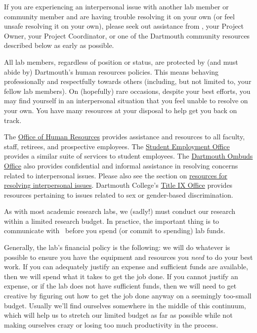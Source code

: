 \documentclass{tufte-book} %
\newcommand{\ourschool}{Dartmouth College}
\begin{document}
\noindent
If you are experiencing an interpersonal issue with another lab member
or community member and are having trouble resolving it on your own
(or feel unsafe resolving it on your own), please seek out assistance
from \director, your Project Owner, your Project Coordinator, or one
of the Dartmouth community resources described below as early as
possible.

All lab members, regardless of position or status, are protected by
(and must abide by) Dartmouth's human resources policies.  This means
behaving professionally and respectfully towards others (including,
but not limited to, your fellow lab members).  On (hopefully) rare
occasions, despite your best efforts, you may find yourself in an
interpersonal situation that you feel unable to resolve on your own.
You have many resources at your disposal to help get you back on
track.

The \href{http://www.dartmouth.edu/~hrs/}{Office of Human Resources} provides
assistance and resources to all faculty, staff, retirees, and prospective
employees. The \href{http://www.dartmouth.edu/~seo/}{Student Employment Office}
provides a similar suite of services to student employees. The
\href{http://www.dartmouth.edu/~ombuds/}{Dartmouth Ombuds Office} also provides
confidential and informal assistance in resolving concerns related to
interpersonal issues. Please also see the section on
\hyperref[sec:interpersonal]{resources for resolving interpersonal issues}.
\ourschool's
\href{https://sexual-respect.dartmouth.edu/compliance/title-ix/about-title-ix}{Title
IX Office} provides resources pertaining to issues related to sex or
gender-based discrimination.



 \noindent As with most academic research labs, we (sadly!) must
 conduct our research within a limited research budget.  In practice,
 the important thing is to communicate with \director~before you spend
 (or commit to spending) lab funds.

 Generally, the lab's financial policy is the following: we will do
 whatever is possible to ensure you have the equipment and resources
 you \textit{need} to do your best work.  If you can adequately
 justify an expense and sufficient funds are available, then we will
 spend what it takes to get the job done.  If you cannot justify an
 expense, or if the lab does not have sufficient funds, then we will
 need to get creative by figuring out how to get the job done anyway
 on a seemingly too-small budget.  Usually we'll find ourselves
 somewhere in the middle of this continuum, which will help us to
 stretch our limited budget as far as possible while not making
 ourselves crazy or losing too much productivity in the process.
\end{document}
